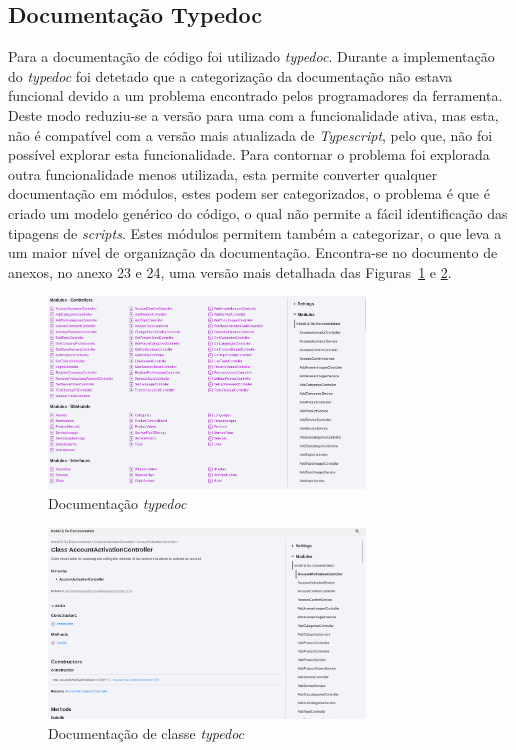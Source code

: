 \subsection{Documentação Typedoc}
Para a documentação de código foi utilizado \textit{typedoc}. Durante a implementação do \textit{typedoc} foi detetado que a categorização da documentação não estava funcional devido a um problema encontrado pelos programadores da ferramenta. Deste modo reduziu-se a versão para uma com a funcionalidade ativa, mas esta, não é compatível com a versão mais atualizada de \textit{Typescript}, pelo que, não foi possível explorar esta funcionalidade. Para contornar o problema foi explorada outra funcionalidade menos utilizada, esta permite converter qualquer documentação em módulos, estes podem ser categorizados, o problema é que é criado um modelo genérico do código, o qual não permite a fácil identificação das tipagens de \textit{scripts}. Estes módulos permitem também a categorizar, o que leva a um maior nível de organização da documentação.
Encontra-se no documento de anexos, no anexo 23 e 24, uma versão mais detalhada das Figuras~\ref*{type_doc} e \ref*{type_doc_det}.

\begin{figure}[htb]
 \centering
 \includegraphics[width=0.75\textwidth]{images/implementacao/api/docs.png}
 \caption{Documentação \textit{typedoc}}
 \label{type_doc}
\end{figure}

\begin{figure}[htb]
 \centering
 \includegraphics[width=0.75\textwidth]{images/implementacao/api/docs_det.png}
 \caption{Documentação de classe \textit{typedoc}}
 \label{type_doc_det}
\end{figure}

